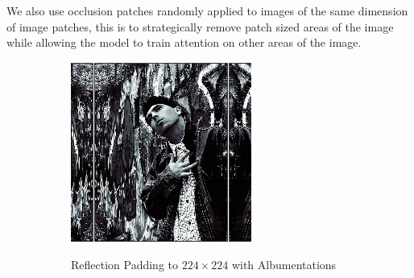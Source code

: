 We also use occlusion patches randomly applied to images of the same dimension of image patches, this is to strategically remove patch sized areas of the image while allowing the model to train attention on other areas of the image. 


\begin{figure}[ht!]
    \centering
    \specialrule{0.01em}{1em}{1em}
\begin{subfigure}[b]{0.2\textwidth}
    \includegraphics[height=\textwidth]{figures/research_methadology/augmentation/112197.jpg}
    \label{reflection_pad}
    \caption{Reflection Padding to $224 \times 224$  with Albumentations}
\end{subfigure}
\hspace{10mm}
\begin{subfigure}[b]{0.2\textwidth}

\end{subfigure}
\end{figure}
